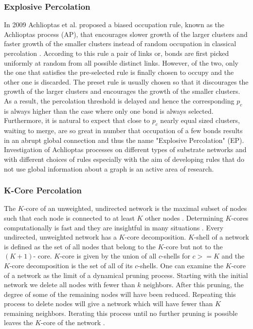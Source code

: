 		\subsubsection{Explosive Percolation}
		In 2009 Achlioptas et al. proposed a biased occupation rule, known as the Achlioptas process (AP), that encourages slower growth of the larger clusters and faster growth of the smaller clusters	instead of random occupation in classical percolation \cite{Achlioptas2009}. According to this rule a pair of links	or, bonds are first picked uniformly at random from all possible distinct links. However, of the		two, only the one that satisfies the pre-selected rule is finally chosen to occupy and the other one	is discarded. The preset rule is usually chosen so that it discourages the growth of the larger	clusters and encourages the growth of the smaller clusters. As a result, the percolation threshold is delayed and hence the corresponding $p_c$ is always higher than the case where only one bond is	always selected. Furthermore, it is natural to expect that close to $p_c$ nearly equal sized clusters, waiting to merge, are so great in number that occupation of a few bonds results in an abrupt global	connection and thus the name "Explosive Percolation" (EP). Investigation of Achlioptas processes on different types of substrate networks and with different choices of rules especially with the aim	of developing rules that do not use global information about a graph is an active area of research.


		\subsubsection{K-Core Percolation}
		The $K$-core of an unweighted, undirected network is the maximal subset of nodes such that each node is connected to at least $K$ other nodes \cite{Seidman1983}. Determining $K$-cores computationally is fast and they are insightful in many situations \cite{Dorogovtsev2006,Csermely2013}. Every undirected, unweighted network has a $K$-core decomposition. $K$-shell of a network is defined as the set of all nodes that belong to the $K$-core but not to the $(K+1) $- core. $K$-core is given by the union of all $c$-shells for $c>=K$ and the $K$-core decomposition is the set of all of its $c$-shells. One can examine the $K$-core of a network as the limit of a dynamical pruning process. Starting with the initial network we delete all nodes with fewer than $k$ neighbors. After this pruning, the degree of some of the remaining nodes will have been reduced. Repeating this process to delete nodes will give a network which will have fewer than $K$ remaining neighbors. Iterating this process until no further pruning is possible leaves the $K$-core of the network \cite{Porter2016}.


